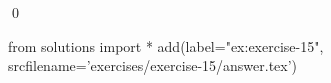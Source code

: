 
\begin{ex} 
  \label{ex:exercise-15}
  
  \qed
\end{ex} 
\begin{python0}
from solutions import *
add(label="ex:exercise-15",
    srcfilename='exercises/exercise-15/answer.tex') 
\end{python0}
